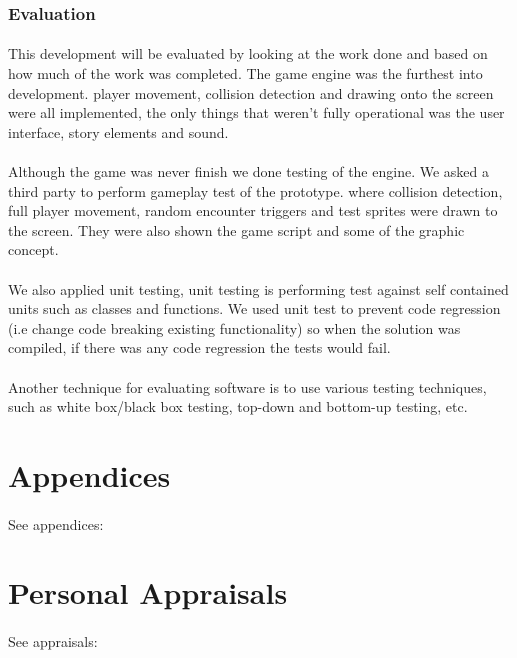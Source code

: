 \documentclass{article}
\begin{document}
\subsubsection{Evaluation}
\paragraph{}
This development will be evaluated by looking at the work done and based on how much of the work was completed. The game engine was the furthest into development. player movement, collision detection and drawing onto the screen were all implemented, the only things that weren't fully operational was the user interface, story elements and sound. 
\paragraph{} 
Although the game was never finish we done testing of the engine. We asked a third party to perform gameplay test of the prototype. where collision detection, full player movement, random encounter triggers and test sprites were drawn to the screen. They were also shown the game script and some of the graphic concept. 
\paragraph{}
We also applied unit testing, unit testing is performing test against self contained units such as classes and functions. We used unit test to prevent code regression (i.e change code breaking existing functionality) so when the solution was compiled, if there was any code regression the tests would fail.
\paragraph{}
Another technique for evaluating software is to use various testing techniques, such as white box/black box testing, top-down and bottom-up testing, etc.

\section{Appendices}
\paragraph{}
See appendices:



\section{Personal Appraisals}
\paragraph{}
See appraisals:
\end{document}
